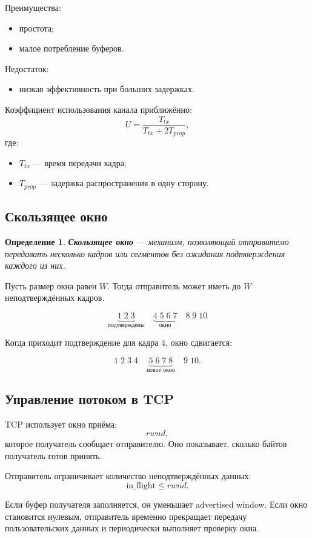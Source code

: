 \documentclass[12pt,a4paper]{article}
\newtheorem{definition}{Определение}
\begin{document}
Преимущества:
\begin{itemize}
    \item простота;
    \item малое потребление буферов.
\end{itemize}

Недостаток:
\begin{itemize}
    \item низкая эффективность при больших задержках.
\end{itemize}

Коэффициент использования канала приближённо:
\[
U = \frac{T_{tx}}{T_{tx} + 2T_{prop}},
\]
где:
\begin{itemize}
    \item $T_{tx}$ --- время передачи кадра;
    \item $T_{prop}$ --- задержка распространения в одну сторону.
\end{itemize}

\subsection{Скользящее окно}

\begin{definition}
\textbf{Скользящее окно} --- механизм, позволяющий отправителю передавать несколько кадров или сегментов без ожидания подтверждения каждого из них.
\end{definition}

Пусть размер окна равен $W$. Тогда отправитель может иметь до $W$ неподтверждённых кадров.

\[
\underbrace{1\;2\;3}_{\text{подтверждены}}
\quad
\underbrace{4\;5\;6\;7}_{\text{окно}}
\quad
8\;9\;10
\]

Когда приходит подтверждение для кадра $4$, окно сдвигается:

\[
1\;2\;3\;4
\quad
\underbrace{5\;6\;7\;8}_{\text{новое окно}}
\quad
9\;10.
\]

\subsection{Управление потоком в TCP}

TCP использует окно приёма:
\[
rwnd,
\]
которое получатель сообщает отправителю. Оно показывает, сколько байтов получатель готов принять.

Отправитель ограничивает количество неподтверждённых данных:
\[
\text{in\_flight} \leq rwnd.
\]

Если буфер получателя заполняется, он уменьшает advertised window. Если окно становится нулевым, отправитель временно прекращает передачу пользовательских данных и периодически выполняет проверку окна.
\end{document}

